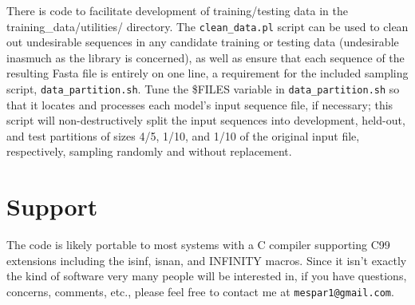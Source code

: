 \documentclass[12pt]{article}
\begin{document}
There is code to facilitate development of training/testing data
in the training\_data/utilities/ directory.
The \texttt{clean\_data.pl} script can be used to clean out undesirable sequences
in any candidate training or testing data (undesirable inasmuch as the library
is concerned), as well as ensure that each sequence of the resulting
Fasta file is entirely on one line, a requirement
for the included sampling script, \texttt{data\_partition.sh}. Tune the
\$FILES variable in \texttt{data\_partition.sh} so that it locates and
processes each model's input sequence file, if necessary; this
script will non-destructively split the input sequences into development, held-out, and test
partitions of sizes 4/5, 1/10, and 1/10 of the original input file, respectively, sampling
randomly and without replacement.

\section{Support}
The code is likely portable to most systems with a C compiler
supporting C99 extensions including the isinf, isnan, and
INFINITY macros.
Since it isn't exactly the kind of software very many people will
be interested in, if you have questions,
concerns, comments, etc., please feel free to contact me at
\texttt{mespar1@gmail.com}.
\end{document}

